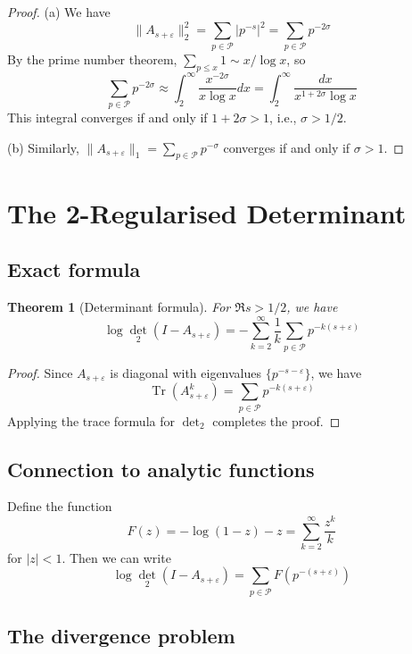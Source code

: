 \documentclass[11pt,a4paper]{article}
\newtheorem{theorem}{Theorem}[section]
\theoremstyle{definition}
\theoremstyle{remark}
\newcommand{\calP}{\mathcal{P}}
\DeclareMathOperator{\Tr}{Tr}
\begin{document}
\begin{proof}
(a) We have
\[
\|A_{s+\varepsilon}\|_2^2 = \sum_{p \in \calP} |p^{-s}|^2 = \sum_{p \in \calP} p^{-2\sigma}
\]
By the prime number theorem, $\sum_{p \leq x} 1 \sim x/\log x$, so
\[
\sum_{p \in \calP} p^{-2\sigma} \approx \int_2^\infty \frac{x^{-2\sigma}}{x \log x} dx = \int_2^\infty \frac{dx}{x^{1+2\sigma} \log x}
\]
This integral converges if and only if $1 + 2\sigma > 1$, i.e., $\sigma > 1/2$.

(b) Similarly, $\|A_{s+\varepsilon}\|_1 = \sum_{p \in \calP} p^{-\sigma}$ converges if and only if $\sigma > 1$.
\end{proof}

\section{The 2-Regularised Determinant}\label{sec:determinant}

\subsection{Exact formula}

\begin{theorem}[Determinant formula]\label{thm:det-formula}
For $\Re s > 1/2$, we have
\[
\log \det_2(I - A_{s+\varepsilon}) = -\sum_{k=2}^\infty \frac{1}{k} \sum_{p \in \calP} p^{-k(s+\varepsilon)}
\]
\end{theorem}

\begin{proof}
Since $A_{s+\varepsilon}$ is diagonal with eigenvalues $\{p^{-s-\varepsilon}\}$, we have
\[
\Tr(A_{s+\varepsilon}^k) = \sum_{p \in \calP} p^{-k(s+\varepsilon)}
\]
Applying the trace formula for $\det_2$ completes the proof.
\end{proof}

\subsection{Connection to analytic functions}

Define the function
\[
F(z) = -\log(1-z) - z = \sum_{k=2}^\infty \frac{z^k}{k}
\]
for $|z| < 1$. Then we can write
\[
\log \det_2(I - A_{s+\varepsilon}) = \sum_{p \in \calP} F(p^{-(s+\varepsilon)})
\]

\subsection{The divergence problem}
\end{document}
